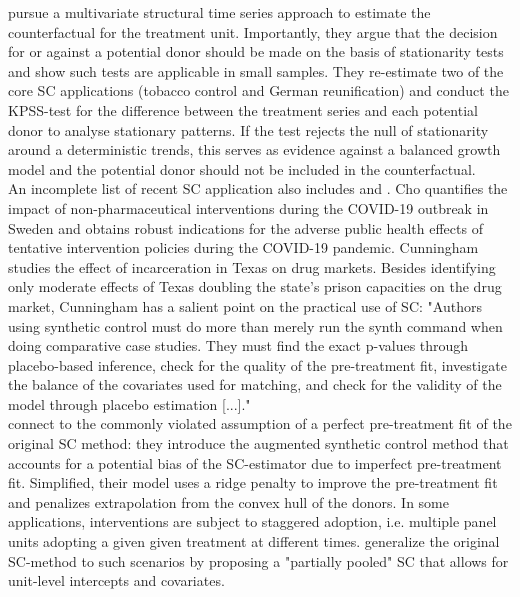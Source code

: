 \cite{harvey:2020} pursue a multivariate structural time series approach to estimate the counterfactual for the treatment unit. Importantly, they argue that the decision for or against a potential donor should be made on the basis of stationarity tests and show such tests are applicable in small samples. They re-estimate two of the core \ac{SC} applications (tobacco control and German reunification) and conduct the KPSS-test for the difference between the treatment series and each potential donor to analyse stationary patterns. If the test rejects the null of stationarity around a deterministic trends, this serves as evidence against a balanced growth model and the potential donor should not be included in the counterfactual.\\
An incomplete list of recent \ac{SC} application also includes \cite{cho:2020} and  \cite{cunningham:2021}. Cho quantifies the impact of non-pharmaceutical interventions during the COVID-19 outbreak in Sweden and obtains robust indications for the adverse public health effects of tentative intervention policies during the COVID-19 pandemic. Cunningham studies the effect of incarceration in Texas on drug markets. Besides identifying only moderate effects of Texas doubling the state's prison capacities on the drug market, Cunningham has a salient point on the practical use of \ac{SC}: "Authors using synthetic control must do more than merely run the synth command when doing comparative case studies. They must find the exact p-values through placebo-based inference, check for the quality of the pre-treatment fit, investigate the balance of the covariates used for matching, and check for the validity of the model through placebo estimation [...]." \\
\cite{benmichael:2021a} connect to the commonly violated assumption of a perfect pre-treatment fit of the original \ac{SC} method: they introduce the augmented synthetic control method that accounts for a potential bias of the \ac{SC}-estimator due to imperfect pre-treatment fit. Simplified, their model uses a ridge penalty to improve the pre-treatment fit and penalizes extrapolation from the convex hull of the donors. In some applications, interventions are subject to staggered adoption, i.e. multiple panel units adopting a given given treatment at different times. \cite{benmichael:2021b} generalize the original \ac{SC}-method to such scenarios by proposing a "partially pooled" \ac{SC} that allows for unit-level intercepts and covariates. \\
